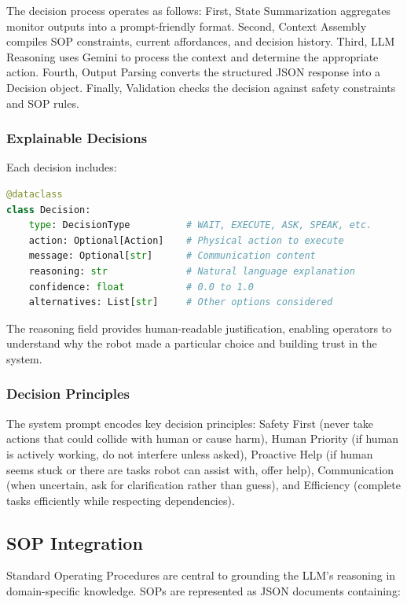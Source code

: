\documentclass[sensors,article,submit,pdftex,moreauthors]{Definitions/mdpi}
\begin{document}
The decision process operates as follows: First, State Summarization aggregates monitor outputs into a prompt-friendly format. Second, Context Assembly compiles SOP constraints, current affordances, and decision history. Third, LLM Reasoning uses Gemini to process the context and determine the appropriate action. Fourth, Output Parsing converts the structured JSON response into a Decision object. Finally, Validation checks the decision against safety constraints and SOP rules.

\subsubsection{Explainable Decisions}

Each decision includes:

\begin{lstlisting}[language=Python, caption=Decision structure with explainability]
@dataclass
class Decision:
    type: DecisionType          # WAIT, EXECUTE, ASK, SPEAK, etc.
    action: Optional[Action]    # Physical action to execute
    message: Optional[str]      # Communication content
    reasoning: str              # Natural language explanation
    confidence: float           # 0.0 to 1.0
    alternatives: List[str]     # Other options considered
\end{lstlisting}

The reasoning field provides human-readable justification, enabling operators to understand why the robot made a particular choice and building trust in the system.

\subsubsection{Decision Principles}

The system prompt encodes key decision principles: Safety First (never take actions that could collide with human or cause harm), Human Priority (if human is actively working, do not interfere unless asked), Proactive Help (if human seems stuck or there are tasks robot can assist with, offer help), Communication (when uncertain, ask for clarification rather than guess), and Efficiency (complete tasks efficiently while respecting dependencies).

\subsection{SOP Integration}

Standard Operating Procedures are central to grounding the LLM's reasoning in domain-specific knowledge. SOPs are represented as JSON documents containing:
\end{document}
